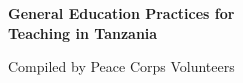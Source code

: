 \begin{titlepage}
\begin{center}
\begin{huge}
\textbf{General Education Practices for\\[6pt]
Teaching in Tanzania}
\end{huge}
\end{center}
\vspace{1in}

\begin{center}
\setlength\fboxsep{0pt}
\setlength\fboxrule{2pt}
\end{center}

\vfill
\begin{center}
\begin{Large}
Compiled by Peace Corps Volunteers\\
\end{Large}
\end{center}

\end{titlepage}